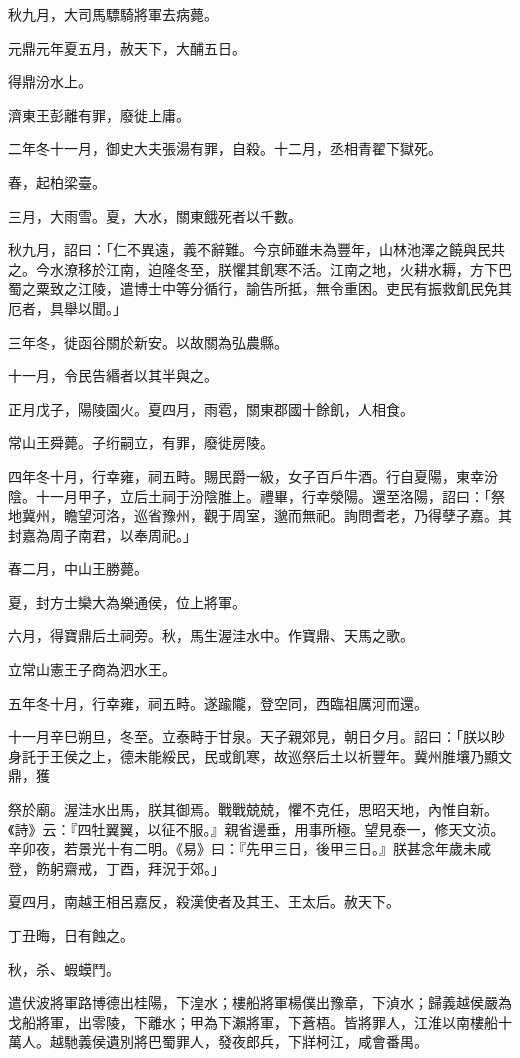 \begin{pinyinscope}
秋九月，大司馬驃騎將軍去病薨。

元鼎元年夏五月，赦天下，大酺五日。

得鼎汾水上。

濟東王彭離有罪，廢徙上庸。

二年冬十一月，御史大夫張湯有罪，自殺。十二月，丞相青翟下獄死。

春，起柏梁臺。

三月，大雨雪。夏，大水，關東餓死者以千數。

秋九月，詔曰：「仁不異遠，義不辭難。今京師雖未為豐年，山林池澤之饒與民共之。今水潦移於江南，迫隆冬至，朕懼其飢寒不活。江南之地，火耕水耨，方下巴蜀之粟致之江陵，遣博士中等分循行，諭告所抵，無令重困。吏民有振救飢民免其厄者，具舉以聞。」

三年冬，徙函谷關於新安。以故關為弘農縣。

十一月，令民告緡者以其半與之。

正月戊子，陽陵園火。夏四月，雨雹，關東郡國十餘飢，人相食。

常山王舜薨。子绗嗣立，有罪，廢徙房陵。

四年冬十月，行幸雍，祠五畤。賜民爵一級，女子百戶牛酒。行自夏陽，東幸汾陰。十一月甲子，立后土祠于汾陰脽上。禮畢，行幸滎陽。還至洛陽，詔曰：「祭地冀州，瞻望河洛，巡省豫州，觀于周室，邈而無祀。詢問耆老，乃得孽子嘉。其封嘉為周子南君，以奉周祀。」

春二月，中山王勝薨。

夏，封方士欒大為樂通侯，位上將軍。

六月，得寶鼎后土祠旁。秋，馬生渥洼水中。作寶鼎、天馬之歌。

立常山憲王子商為泗水王。

五年冬十月，行幸雍，祠五畤。遂踰隴，登空同，西臨祖厲河而還。

十一月辛巳朔旦，冬至。立泰畤于甘泉。天子親郊見，朝日夕月。詔曰：「朕以眇身託于王侯之上，德未能綏民，民或飢寒，故巡祭后土以祈豐年。冀州脽壤乃顯文鼎，獲

祭於廟。渥洼水出馬，朕其御焉。戰戰兢兢，懼不克任，思昭天地，內惟自新。《詩》云：『四牡翼翼，以征不服。』親省邊垂，用事所極。望見泰一，修天文浈。辛卯夜，若景光十有二明。《易》曰：『先甲三日，後甲三日。』朕甚念年歲未咸登，飭躬齋戒，丁酉，拜況于郊。」

夏四月，南越王相呂嘉反，殺漢使者及其王、王太后。赦天下。

丁丑晦，日有蝕之。

秋，杀、蝦蟆鬥。

遣伏波將軍路博德出桂陽，下湟水；樓船將軍楊僕出豫章，下湞水；歸義越侯嚴為戈船將軍，出零陵，下離水；甲為下瀨將軍，下蒼梧。皆將罪人，江淮以南樓船十萬人。越馳義侯遺別將巴蜀罪人，發夜郎兵，下牂柯江，咸會番禺。


\end{pinyinscope}
